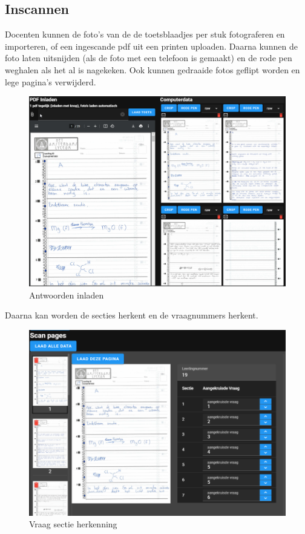 \documentclass[12pt]{article}
\begin{document}
\subsection{Inscannen}
Docenten kunnen de foto's van de de toetsblaadjes per stuk fotograferen en importeren, of een ingescande pdf uit een printen uploaden. Daarna kunnen de foto laten uitsnijden (als de foto met een telefoon is gemaakt) en de rode pen weghalen als het al is nagekeken. Ook kunnen gedraaide fotos geflipt worden en lege pagina's verwijderd.
\begin{figure}[H]
    \centering
    \includegraphics[width=\linewidth]{./images/demo/scanning/load.png}
    \caption{Antwoorden inladen}
    \label{fig:load-student-pdf}
\end{figure}
Daarna kan worden de secties herkent en de vraagnummers herkent.
\begin{figure}[H]
    \centering
    \includegraphics[width=\linewidth]{./images/demo/scanning/checkbox.png}
    \caption{Vraag sectie herkenning}
    \label{fig:scan-checkbox}
\end{figure}
\end{document}
